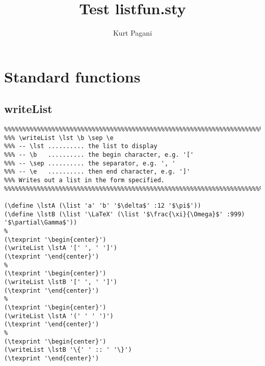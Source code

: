 \documentclass[10pt,a4paper]{article}
\author{Kurt Pagani}
\title{Test listfun.sty}
\begin{document}
\maketitle
\tableofcontents

\section{Standard functions}

\subsection{writeList}
\begin{verbatim}
%%%%%%%%%%%%%%%%%%%%%%%%%%%%%%%%%%%%%%%%%%%%%%%%%%%%%%%%%%%%%%%%%%%%%%%%%%%%%
%%% \writeList \lst \b \sep \e 
%%% -- \lst .......... the list to display
%%% -- \b   .......... the begin character, e.g. '['
%%% -- \sep .......... the separator, e.g. ', '
%%% -- \e   .......... then end character, e.g. ']'
%%% Writes out a list in the form specified.
%%%%%%%%%%%%%%%%%%%%%%%%%%%%%%%%%%%%%%%%%%%%%%%%%%%%%%%%%%%%%%%%%%%%%%%%%%%%%
 
(\define \lstA (\list 'a' 'b' '$\delta$' :12 '$\pi$'))
(\define \lstB (\list '\LaTeX' (\list '$\frac{\xi}{\Omega}$' :999) '$\partial\Gamma$'))
%
(\texprint '\begin{center}')
(\writeList \lstA '[' ', ' ']')
(\texprint '\end{center}')
%
(\texprint '\begin{center}')
(\writeList \lstB '[' ', ' ']')
(\texprint '\end{center}') 
%
(\texprint '\begin{center}')
(\writeList \lstA '(' ' ' ')')
(\texprint '\end{center}')
%
(\texprint '\begin{center}')
(\writeList \lstB '\{' ' :: ' '\}')
(\texprint '\end{center}')
\end{verbatim}

\begin{framed}
\end{framed}
\end{document}
